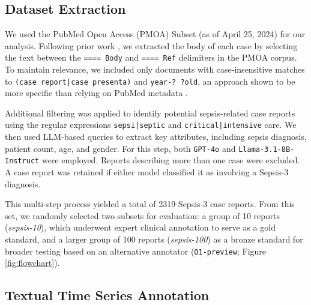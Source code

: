 \documentclass[letterpaper]{article} %
\begin{document}
\subsection{Dataset Extraction}
We used the PubMed Open Access (PMOA) Subset (as of April 25, 2024) for our analysis. Following prior work \cite{wang2025large}, we extracted the body of each case by selecting the text between the \texttt{==== Body} and \texttt{==== Ref} delimiters in the PMOA corpus. To maintain relevance, we included only documents with case-insensitive matches to \texttt{(case report|case presenta)} and \texttt{year-? ?old}, an approach shown to be more specific than relying on PubMed metadata \cite{noroozizadeh2025reconstructing}.


Additional filtering was applied to identify potential sepsis-related case reports using the regular expressions \texttt{sepsi|\allowbreak septic} and \texttt{critical|intensive} care. We then used LLM-based queries to extract key attributes, including sepsis diagnosis, patient count, age, and gender. For this step, both \texttt{GPT-4o} and \texttt{Llama-3.1-8B-Instruct} were employed. Reports describing more than one case were excluded. A case report was retained if either model classified it as involving a Sepsis-3 diagnosis.

This multi-step process yielded a total of 2319 Sepsis-3 case reports. From this set, we randomly selected two subsets for evaluation: a group of 10 reports (\textit{sepsis-10}), which underwent expert clinical annotation to serve as a gold standard, and a larger group of 100 reports (\textit{sepsis-100}) as a bronze standard for broader testing based on an alternative annotator (\texttt{O1-preview}; Figure \ref{fig:flowchart}). %

\subsection{Textual Time Series Annotation}
\label{sec:tts-annotation}
\end{document}
